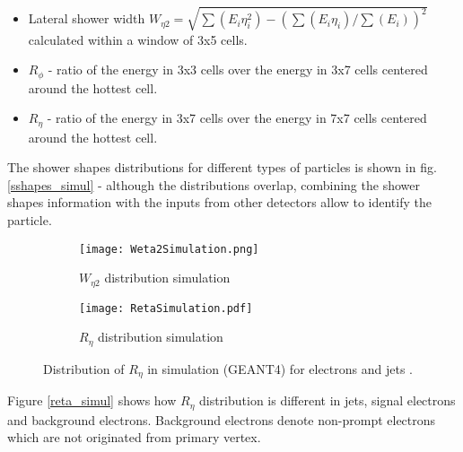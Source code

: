   \begin{itemize}
  	\item Lateral shower width $W_{\eta 2} = \sqrt{\sum(E_i \eta^{2}_{i})-(\sum(E_i \eta_{i})/\sum(E_i))^2}$ calculated within a window of 3x5 cells.
  	\item $R_{\phi}$ - ratio of the energy in 3x3 cells over the energy in 3x7 cells centered around the hottest cell.
  	\item $R_{\eta}$ - ratio of the energy in 3x7 cells over the energy in 7x7 cells centered around the hottest cell.
  \end{itemize}
  
  The shower shapes distributions for different types of particles is shown in fig. \ref{sshapes_simul} - although the distributions overlap, combining the shower shapes information with the inputs from other detectors allow to identify the particle.  
    	\begin{figure}[htbp]
	\begin{subfigure}[t]{0.4\textwidth}
		\texttt{[image: Weta2Simulation.png]}
		\caption[ $W_{\eta 2}$]{$W_{\eta 2}$ distribution simulation}
		\label{fig::weta2_simul}
	\end{subfigure}
	\hfill
	\begin{subfigure}[t]{0.39\textwidth} 
		\texttt{[image: RetaSimulation.pdf]}
		\caption[ $R_{\eta}$]{$R_{\eta}$ distribution simulation}
		\label{fig::reta_simul}
	\end{subfigure}
  	\caption{Distribution of $R_{\eta}$ in simulation (GEANT4) for electrons and jets \cite{sshapes_simulation}.}
	\label{fig::sshapes_simul}
\end{figure}

  Figure \ref{reta_simul} shows how $R_{\eta}$ distribution is different in jets, signal electrons and background electrons. Background electrons denote non-prompt electrons which are not originated from primary vertex. \\
 
